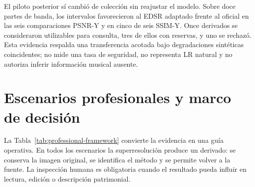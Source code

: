El piloto posterior sí cambió de colección sin reajustar el modelo. Sobre doce partes de banda, los
intervalos favorecieron al EDSR adaptado frente al oficial en las seis comparaciones PSNR-Y y en
cinco de seis SSIM-Y. Once derivados se consideraron utilizables para consulta, tres de ellos con
reservas, y uno se rechazó. Esta evidencia respalda una transferencia acotada bajo degradaciones
sintéticas coincidentes; no mide una tasa de seguridad, no representa LR natural y no autoriza
inferir información musical ausente.

\section{Escenarios profesionales y marco de decisión}
La Tabla~\ref{tab:professional-framework} convierte la evidencia en una guía operativa. En todos los
escenarios la superresolución produce un derivado: se conserva la imagen original, se identifica el
método y se permite volver a la fuente. La inspección humana es obligatoria cuando el resultado
pueda influir en lectura, edición o descripción patrimonial.

